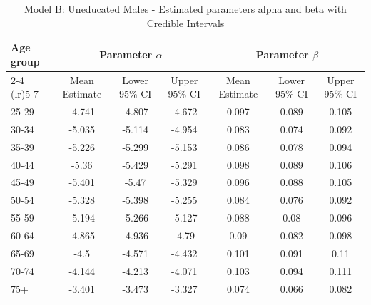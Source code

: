 \begin{landscape}
\begin{table}[htbp]
\centering
\caption{Model B: Uneducated Males - Estimated parameters alpha and beta  with Credible Intervals}
\label{tab:parameters_ab13}
\begin{tabular}{@{}lcccccc@{}}
\toprule
Age group & \multicolumn{3}{c}{Parameter \(\alpha\)} & \multicolumn{3}{c}{Parameter \(\beta\)} \\ 
\cmidrule(lr){2-4} \cmidrule(lr){5-7}
          & Mean Estimate & Lower 95\% CI & Upper 95\% CI & Mean Estimate & Lower 95\% CI & Upper 95\% CI \\ 
\midrule
25-29 & -4.741 & -4.807 & -4.672 & 0.097 & 0.089 & 0.105 \\
30-34 & -5.035 & -5.114 & -4.954 & 0.083 & 0.074 & 0.092 \\
35-39 & -5.226 & -5.299 & -5.153 & 0.086 & 0.078 & 0.094 \\
40-44 & -5.36 & -5.429 & -5.291 & 0.098 & 0.089 & 0.106 \\
45-49 & -5.401 & -5.47 & -5.329 & 0.096 & 0.088 & 0.105 \\
50-54 & -5.328 & -5.398 & -5.255 & 0.084 & 0.076 & 0.092 \\
55-59 & -5.194 & -5.266 & -5.127 & 0.088 & 0.08 & 0.096 \\
60-64 & -4.865 & -4.936 & -4.79 & 0.09 & 0.082 & 0.098 \\
65-69 & -4.5 & -4.571 & -4.432 & 0.101 & 0.091 & 0.11 \\
70-74 & -4.144 & -4.213 & -4.071 & 0.103 & 0.094 & 0.111 \\
75+ & -3.401 & -3.473 & -3.327 & 0.074 & 0.066 & 0.082 \\
\bottomrule
\end{tabular}
\end{table}
\end{landscape}